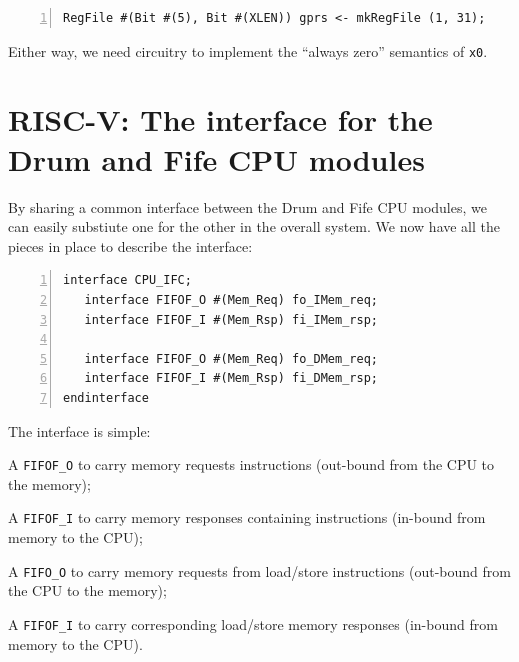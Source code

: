 \begin{Verbatim}[frame=single, numbers=left]
   RegFile #(Bit #(5), Bit #(XLEN)) gprs <- mkRegFile (1, 31);
\end{Verbatim}

Either way, we need circuitry to implement the ``always zero''
semantics of \verb|x0|.


\section{RISC-V: The interface for the Drum and Fife CPU modules}

\label{Sec_CPU_Module_Skeleton_CPU_interface}

By sharing a common interface between the Drum and Fife CPU
modules, we can easily substiute one for the other in the overall
system.  We now have all the pieces in place to describe the interface:


\begin{Verbatim}[frame=single, numbers=left]
interface CPU_IFC;
   interface FIFOF_O #(Mem_Req) fo_IMem_req;
   interface FIFOF_I #(Mem_Rsp) fi_IMem_rsp;

   interface FIFOF_O #(Mem_Req) fo_DMem_req;
   interface FIFOF_I #(Mem_Rsp) fi_DMem_rsp;
endinterface
\end{Verbatim}

The interface is simple:

\begin{tightlist}

\item A \verb|FIFOF_O| to carry memory requests instructions (out-bound
from the CPU to the memory);

\item A \verb|FIFOF_I| to carry memory responses containing
instructions (in-bound from memory to the CPU);

\item A \verb|FIFO_O| to carry memory requests from load/store
instructions (out-bound from the CPU to the memory);

\item A \verb|FIFOF_I| to carry corresponding load/store memory
responses (in-bound from memory to the CPU).

\end{tightlist}

